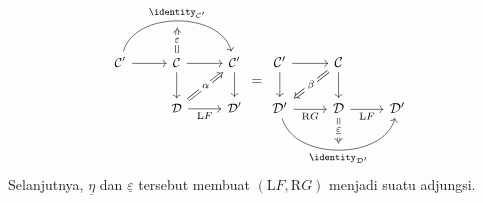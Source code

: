 \begin{teorema}
\begin{equation*}
\begin{gathered}
\begin{tikzcd}[every cell/.append style = {font = \small}]
		\end{tikzcd} \\
		\begin{tikzcd}[every cell/.append style = {font = \small}]
			\mathcal{C}' \arrow[r] \arrow[bend left=75, rr, "{\identity_{\mathcal{C}'}}", ""' {name=I}] & \mathcal{C} \arrow[r] \arrow[d] \arrow[Rightarrow, to=I, "\varepsilon" description] & \mathcal{C}' \arrow[d] \\
			& \mathcal{D} \arrow[r, "{\mathrm{L}F}"'] \arrow[Rightarrow, ru, "\alpha" description] & \mathcal{D}'
		\end{tikzcd} = \begin{tikzcd}
			\mathcal{C}' \arrow[r] \arrow[d] & \mathcal{C} \arrow[d] \arrow[Rightarrow, ld, "\beta" description] & \\
			\mathcal{D}' \arrow[r, "{\mathrm{R}G}"'] \arrow[rr, bend right=75, "{\identity_{\mathcal{D}'}}"', "" {name=I}] & \mathcal{D} \arrow[r, "{\mathrm{L}F}"'] \arrow[Rightarrow, to=I, "\underline{\varepsilon}" description] & \mathcal{D}'
		\end{tikzcd}
	\end{gathered}\end{equation*}
	Selanjutnya, $\underline{\eta}$ dan $\underline{\varepsilon}$ tersebut
	membuat $(\mathrm{L}F, \mathrm{R}G)$ menjadi suatu adjungsi.
\end{teorema}
